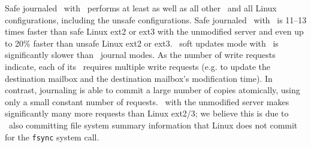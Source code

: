 Safe journaled \Kudos\ with \patchgroups\ performs at least as well as
all other \Kudos\ and all Linux configurations, including the unsafe
configurations. Safe journaled \Kudos\ with \patchgroups\ is 11--13
times faster than safe Linux ext2 or ext3 with the unmodified server
and even up to 20\% faster than unsafe Linux ext2 or ext3.
%
\Kudos\ soft updates mode with \patchgroups\ is significantly slower
than \Kudos\ journal modes. As the number of write requests indicate,
each of its \patchgroups\ requires multiple write requests (e.g. to
update the destination mailbox and the destination mailbox's
modification time). In contrast, journaling is able to commit a large
number of copies atomically, using only a small constant number of
requests.
%
\Kudos\ with the unmodified server makes significantly many more
requests than Linux ext2/3; we believe this is due to \Kudos\ also
committing file system summary information that Linux does not commit
for the \texttt{fsync} system call.

